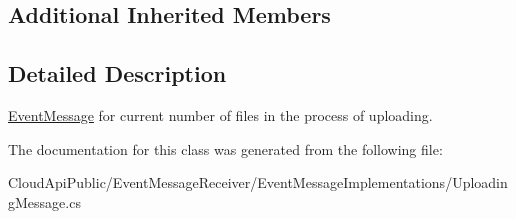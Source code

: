 \subsection*{Additional Inherited Members}


\subsection{Detailed Description}
\hyperlink{class_cloud_api_public_1_1_event_message_receiver_1_1_event_message}{Event\-Message} for current number of files in the process of uploading. 



The documentation for this class was generated from the following file\-:\begin{DoxyCompactItemize}
\item 
Cloud\-Api\-Public/\-Event\-Message\-Receiver/\-Event\-Message\-Implementations/Uploading\-Message.\-cs\end{DoxyCompactItemize}
